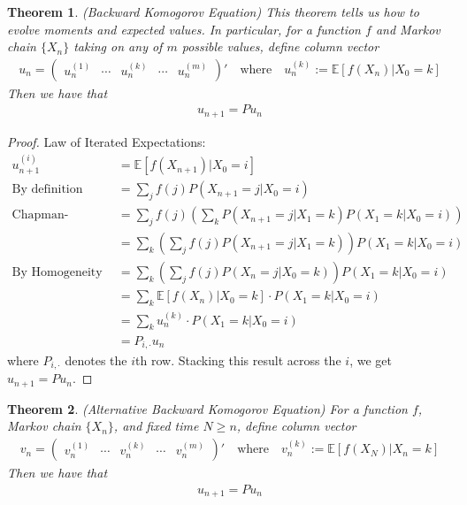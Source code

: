 \documentclass[12pt]{article}
\theoremstyle{plain}
\newtheorem{thm}{Theorem}[section]
\theoremstyle{definition}
\theoremstyle{remark}
\begin{document}
\begin{thm}{\emph{(Backward Komogorov Equation)}}
This theorem tells us how to evolve moments and expected values. In
particular, for a function $f$ and Markov chain $\{X_n\}$ taking on any
of $m$ possible values, define column vector
\begin{align*}
  u_n =
  \begin{pmatrix}
    u^{(1)}_n & \cdots & u^{(k)}_n & \cdots & u^{(m)}_n
  \end{pmatrix}'
  \quad\text{where}\quad
  u^{(k)}_n := \mathbb{E}[f(X_n)|X_0=k]
\end{align*}
Then we have that
\begin{align*}
  u_{n+1} = P u_n
\end{align*} \end{thm}
\begin{proof}
Law of Iterated Expectations:
\begin{align*}
  u_{n+1}^{(i)} &= \mathbb{E}[f(X_{n+1})|X_0=i]\\
  \text{By definition}\qquad
  &= \sum_j f(j) P(X_{n+1}=j |X_0=i)\\
  \text{Chapman-Komogorov}\qquad
  &= \sum_j f(j) \left(\sum_k P(X_{n+1}=j |X_1 = k) P(X_1=k|X_0=i)\right)\\
  &= \sum_k \left(\sum_j f(j) P(X_{n+1}=j |X_1 = k)\right) P(X_1=k|X_0=i)\\
  \text{By Homogeneity}\qquad
  &= \sum_k \left(\sum_j f(j) P(X_{n}=j |X_0 = k)\right) P(X_1=k|X_0=i)\\
  &= \sum_k \mathbb{E}[f(X_n)|X_0=k] \cdot P(X_1=k|X_0=i)\\
  &= \sum_k u^{(k)}_n \cdot P(X_1=k|X_0=i)\\
  &= P_{i,\cdot} u_n
\end{align*}
where $P_{i,\cdot}$ denotes the $i$th row. Stacking this result across
the $i$, we get $u_{n+1}=Pu_n$.
\end{proof}

\begin{thm}{\emph{(Alternative Backward Komogorov Equation)}}
For a function $f$, Markov chain $\{X_n\}$, and fixed time $N\geq n$,
define column vector
\begin{align*}
  v_n =
  \begin{pmatrix}
    v^{(1)}_n & \cdots & v^{(k)}_n & \cdots & v^{(m)}_n
  \end{pmatrix}'
  \quad\text{where}\quad
  v^{(k)}_n := \mathbb{E}[f(X_N)|X_n=k]
\end{align*}
Then we have that
\begin{align*}
  u_{n+1} = P u_n
\end{align*}
\end{thm}
\end{document}
